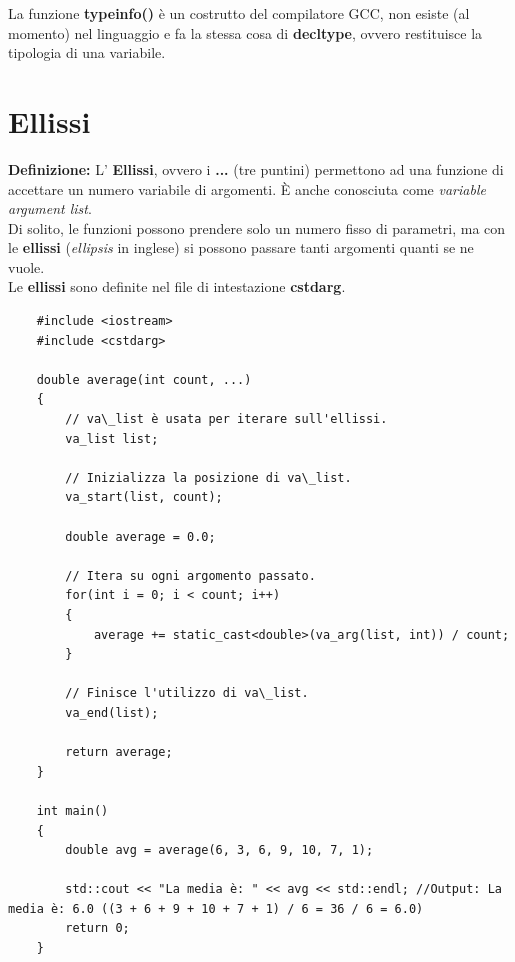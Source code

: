 \textsf{\small La funzione \textbf{typeinfo()} è un costrutto del compilatore GCC, non esiste (al momento) nel linguaggio e fa la stessa cosa di \textbf{decltype}, ovvero restituisce la tipologia di una variabile.} \\


\newpage

\section{Ellissi}

\textsf{\small \textbf{Definizione: } L' \textbf{Ellissi}, ovvero i \textbf{...} (tre puntini) permettono ad una funzione di accettare un numero variabile di argomenti. È anche conosciuta come \emph{variable argument list}. } \\

\textsf{\small Di solito, le funzioni possono prendere solo un numero fisso di parametri, ma con le \textbf{ellissi} (\emph{ellipsis} in inglese) si possono passare tanti argomenti quanti se ne vuole. } \\

\textsf{\small Le \textbf{ellissi} sono definite nel file di intestazione \textbf{cstdarg}.} \\

\begin{lstlisting}
	#include <iostream>
	#include <cstdarg>
	
	double average(int count, ...)
	{
		// va\_list è usata per iterare sull'ellissi.
		va_list list;
		
		// Inizializza la posizione di va\_list.
		va_start(list, count);
		
		double average = 0.0;
		
		// Itera su ogni argomento passato.
		for(int i = 0; i < count; i++)
		{
			average += static_cast<double>(va_arg(list, int)) / count;
		}
	
		// Finisce l'utilizzo di va\_list.
		va_end(list);
		
		return average;
	}

	int main()
	{
		double avg = average(6, 3, 6, 9, 10, 7, 1);
		
		std::cout << "La media è: " << avg << std::endl; //Output: La media è: 6.0 ((3 + 6 + 9 + 10 + 7 + 1) / 6 = 36 / 6 = 6.0)
		return 0;
	}
\end{lstlisting}

